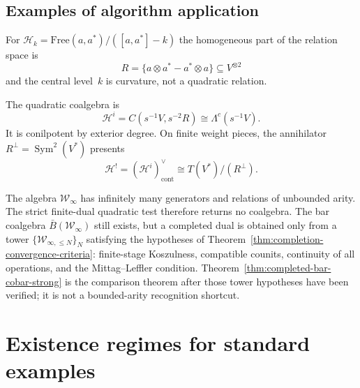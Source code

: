 \subsection{Examples of algorithm application}

\begin{example}\label{ex:algorithm-heisenberg}
For
$\mathcal{H}_k = \text{Free}(a, a^*) / ([a, a^*] - k)$
the homogeneous part of the relation space is
\[R = \{a \otimes a^* - a^* \otimes a\} \subseteq V^{\otimes 2}\]
and the central level~$k$ is curvature, not a quadratic relation.

The quadratic coalgebra is
\[
 \mathcal H^i=C(s^{-1}V,s^{-2}R)\cong\Lambda^c(s^{-1}V).
\]
It is conilpotent by exterior degree.  On finite weight pieces, the
annihilator $R^\perp=\operatorname{Sym}^2(V^*)$ presents
\[
 \mathcal H^!=(\mathcal H^i)^\vee_{\mathrm{cont}}
 \cong T(V^*)/(R^\perp).
\]
\end{example}

\begin{example}\label{ex:algorithm-w-infinity}
The algebra $\mathcal{W}_\infty$ has infinitely many generators and
relations of unbounded arity. The strict finite-dual quadratic test
therefore returns no coalgebra. The bar coalgebra
$\bar{B}(\mathcal{W}_\infty)$ still exists, but a completed dual is
obtained only from a tower
$\{\mathcal W_{\infty,\le N}\}_N$ satisfying the hypotheses of
Theorem~\ref{thm:completion-convergence-criteria}: finite-stage
Koszulness, compatible counits, continuity of all operations, and the
Mittag--Leffler condition. Theorem~\ref{thm:completed-bar-cobar-strong}
is the comparison theorem after those tower hypotheses have been
verified; it is not a bounded-arity recognition shortcut.
\end{example}


\section{Existence regimes for standard examples}
\label{sec:classification-standard-examples}

